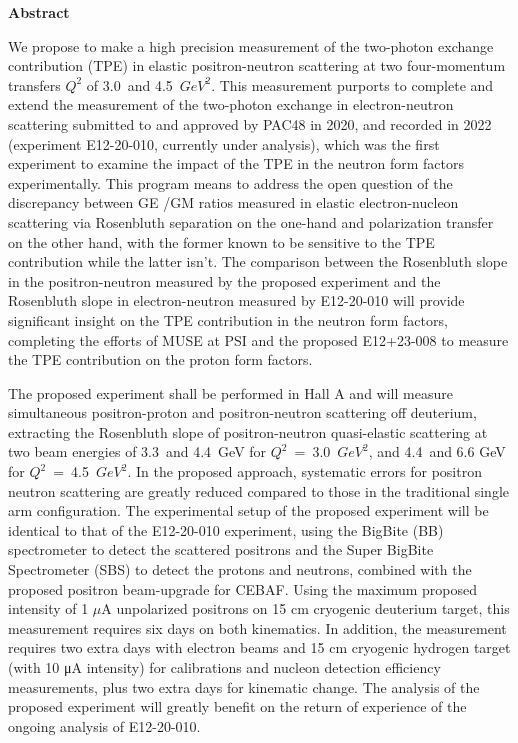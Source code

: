 \begin{center}
{{\large {\bf Abstract}}} 
\end{center}


We propose to make a high precision measurement of the two-photon exchange contribution (TPE) in elastic positron-neutron scattering at two four-momentum transfers $Q^2$ of 3.0~and 4.5~$GeV^2$. This measurement purports to complete and extend the measurement of the two-photon exchange in electron-neutron scattering submitted to and approved by PAC48 in 2020, and recorded in 2022 (experiment E12-20-010, currently under analysis), which was the first experiment to examine the impact of the TPE in the neutron form factors experimentally. This program means to address the open question of the discrepancy between GE /GM ratios measured in elastic electron-nucleon scattering via Rosenbluth separation on the one-hand and polarization transfer on the other hand, with the former known to be sensitive to the TPE contribution while the latter isn’t.
The comparison between the Rosenbluth slope in the positron-neutron measured by the proposed experiment and the Rosenbluth slope in electron-neutron measured by E12-20-010 will provide significant insight on the TPE contribution in the neutron form factors, completing the efforts of MUSE at PSI and the proposed E12+23-008 to measure the TPE contribution on the proton form factors.

The proposed experiment shall be performed in Hall A and will measure simultaneous positron-proton and positron-neutron scattering off deuterium, extracting the Rosenbluth slope of positron-neutron quasi-elastic scattering at two beam energies of 3.3~and 4.4~GeV for $Q^2$~=~3.0~$GeV^2$, and 4.4~and 6.6 GeV for $Q^2$~=~4.5~$GeV^2$. In the proposed approach, systematic errors for positron neutron scattering are greatly reduced compared to those in the traditional single arm configuration.
The experimental setup of the proposed experiment will be identical to that of the E12-20-010 experiment, using the BigBite (BB) spectrometer to detect the scattered positrons and the Super BigBite Spectrometer (SBS) to detect the protons and neutrons, combined with the proposed positron beam-upgrade for CEBAF. Using the maximum proposed intensity of 1 $\mu$A unpolarized positrons on 15 cm cryogenic deuterium target, this measurement requires six days on both kinematics.
In addition, the measurement requires two extra days with electron beams and 15 cm cryogenic hydrogen target (with 10 μA intensity) for calibrations and nucleon detection efficiency measurements, plus two extra days for kinematic change. The analysis of the proposed experiment will greatly benefit on the return of experience of the ongoing analysis of E12-20-010.

